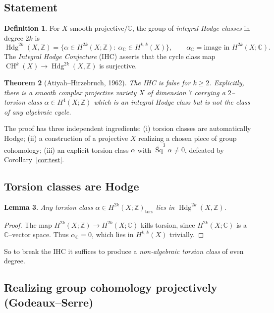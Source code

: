 \documentclass[11pt]{article}
\newtheorem{theorem}{Theorem}[section]
\newtheorem{lemma}[theorem]{Lemma}
\theoremstyle{definition}
\newtheorem{definition}[theorem]{Definition}
\DeclareMathOperator{\Sq}{Sq}
\DeclareMathOperator{\CH}{CH}
\DeclareMathOperator{\Hdg}{Hdg}
\newcommand{\Z}{\mathbb{Z}}
\newcommand{\C}{\mathbb{C}}
\begin{document}
\subsection{Statement}

\begin{definition}
For $X$ smooth projective$/\C$, the group of \emph{integral Hodge classes} in
degree $2k$ is
\[
  \Hdg^{2k}(X,\Z)=\big\{\alpha\in H^{2k}(X;\Z):\ \alpha_\C\in H^{k,k}(X)\big\},
  \qquad \alpha_\C=\text{image in }H^{2k}(X;\C).
\]
The \emph{Integral Hodge Conjecture} (IHC) asserts that the cycle class map
$\CH^k(X)\to \Hdg^{2k}(X,\Z)$ is surjective.
\end{definition}

\begin{theorem}[Atiyah--Hirzebruch, 1962]\label{thm:AH}
The IHC is false for $k\ge 2$. Explicitly, there is a smooth complex projective
variety $X$ of dimension $7$ carrying a $2$--torsion class
$\alpha\in H^4(X;\Z)$ which is an integral Hodge class but is not the class of any
algebraic cycle.
\end{theorem}

The proof has three independent ingredients: (i) torsion classes are automatically
Hodge; (ii) a construction of a projective $X$ realizing a chosen piece of group
cohomology; (iii) an explicit torsion class $\alpha$ with
$\widetilde{\Sq}^3\alpha\neq 0$, defeated by Corollary~\ref{cor:test}.

\subsection{Torsion classes are Hodge}

\begin{lemma}\label{lem:torsionHodge}
Any torsion class $\alpha\in H^{2k}(X;\Z)_{\mathrm{tors}}$ lies in
$\Hdg^{2k}(X,\Z)$.
\end{lemma}

\begin{proof}
The map $H^{2k}(X;\Z)\to H^{2k}(X;\C)$ kills torsion, since $H^{2k}(X;\C)$ is a
$\C$--vector space. Thus $\alpha_\C=0$, which lies in $H^{k,k}(X)$ trivially.
\end{proof}

So to break the IHC it suffices to produce a \emph{non‑algebraic torsion class} of
even degree.

\subsection{Realizing group cohomology projectively (Godeaux--Serre)}
\end{document}
